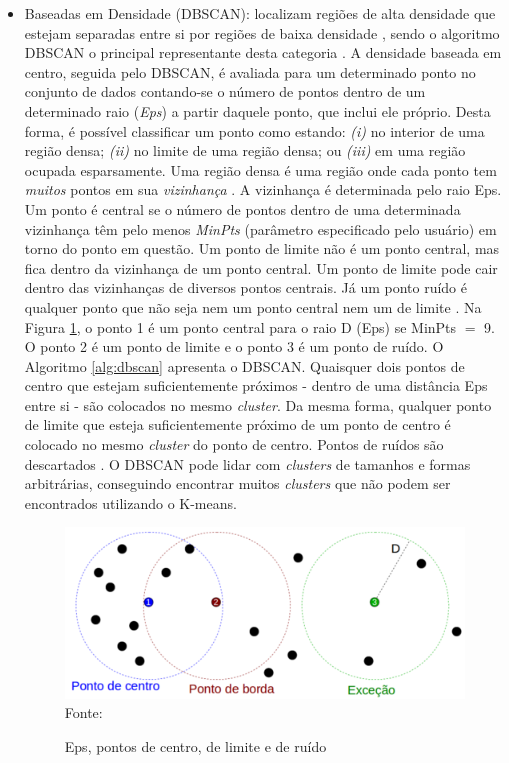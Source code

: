 \begin{itemize}
    
    \item Baseadas em Densidade (DBSCAN): localizam regiões de alta densidade que estejam separadas entre si por regiões de baixa densidade \cite{ester1996}, sendo o algoritmo DBSCAN o principal representante desta categoria \cite{pang2009}.
    A densidade baseada em centro, seguida pelo DBSCAN, é avaliada para um determinado ponto no conjunto de dados contando-se o número de pontos dentro de um determinado raio (\textit{Eps}) a partir daquele ponto, que inclui ele próprio. Desta forma, é possível classificar um ponto como estando: \textit{(i)} no interior de uma região densa; \textit{(ii)} no limite de uma região densa; ou \textit{(iii)} em uma região ocupada esparsamente. Uma região densa é uma região onde cada ponto tem \textit{muitos} pontos em sua \textit{vizinhança} \cite{vania2018-2}. A vizinhança é determinada pelo raio Eps. Um ponto é central se o número de pontos dentro de uma determinada vizinhança têm pelo menos \textit{MinPts} (parâmetro especificado pelo usuário) em torno do ponto em questão. Um ponto de limite não é um ponto central, mas fica dentro da vizinhança de um ponto central. Um ponto de limite pode cair dentro das vizinhanças de diversos pontos centrais. Já um ponto ruído é qualquer ponto que não seja nem um ponto central nem um de limite \cite{pang2009}. Na Figura \ref{fig:dbscan}, o ponto 1 é um ponto central para o raio D (Eps) se MinPts \textbf{\({=}\)} 9. O ponto 2 é um ponto de limite e o ponto 3 é um ponto de ruído. O Algoritmo \ref{alg:dbscan} apresenta o DBSCAN. Quaisquer dois pontos de centro que estejam suficientemente próximos - dentro de uma distância Eps entre si - são colocados no mesmo \textit{cluster}. Da mesma forma, qualquer ponto de limite que esteja suficientemente próximo de um ponto de centro é colocado no mesmo \textit{cluster} do ponto de centro. Pontos de ruídos são descartados \cite{pang2009}. O DBSCAN pode lidar com \textit{clusters} de tamanhos e formas arbitrárias, conseguindo encontrar muitos \textit{clusters} que não podem ser encontrados utilizando o K-means.
   
    \begin{figure}[!htb]
       \centering
       \caption{Eps, pontos de centro, de limite e de ruído}\label{fig:dbscan} 
       \includegraphics[scale=0.80]{figuras/dbscan.png}
       \\Fonte: \cite{wikilivros}
    \end{figure}
    

\end{itemize}
